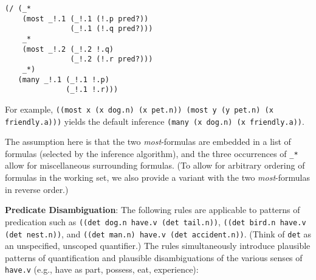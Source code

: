 \documentclass[a4,11pt]{article}
\begin{document}
%
\small
\begin{verbatim}
(/ (_* 
    (most _!.1 (_!.1 (!.p pred?)) 
               (_!.1 (!.q pred?))) 
    _* 
    (most _!.2 (_!.2 !.q) 
               (_!.2 (!.r pred?))) 
    _*)
   (many _!.1 (_!.1 !.p) 
              (_!.1 !.r)))
\end{verbatim}
\normalsize
For example, \texttt{((most x (x dog.n) (x pet.n)) (most y (y pet.n) (x friendly.a)))} yields the default inference \texttt{(many (x dog.n) (x friendly.a))}.

The assumption here is that the two {\it most}-formulas are embedded in a list of formulas (selected by the inference algorithm), and the three occurrences of \texttt{\_*} allow for miscellaneous surrounding formulas. (To allow for arbitrary ordering of formulas in the working set, we also provide a variant with the two {\it most}-formulas in reverse order.)



{\bf Predicate Disambiguation}:
The following rules are applicable to patterns of predication such as \texttt{((det dog.n have.v (det tail.n))}, \texttt{((det bird.n have.v (det nest.n))}, and \texttt{((det man.n) have.v (det accident.n))}. (Think of \texttt{det} as an unspecified, unscoped quantifier.) The rules simultaneously introduce plausible patterns of quantification and plausible disambiguations of the various senses of \texttt{have.v} (e.g., have as part, possess, eat, experience):
\end{document}
